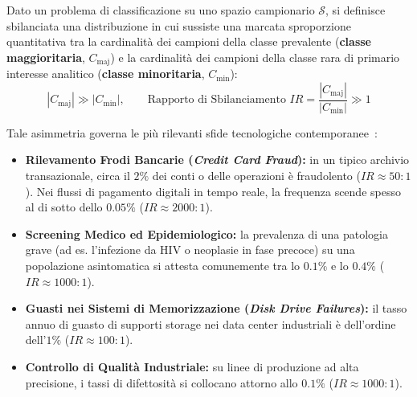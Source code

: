 \begin{definition}
Dato un problema di classificazione su uno spazio campionario $\mathcal{S}$, si definisce sbilanciata una distribuzione in cui sussiste una marcata sproporzione quantitativa tra la cardinalità dei campioni della classe prevalente (\textbf{classe maggioritaria}, $C_{\text{maj}}$) e la cardinalità dei campioni della classe rara di primario interesse analitico (\textbf{classe minoritaria}, $C_{\text{min}}$):
\begin{equation}
    |C_{\text{maj}}| \gg |C_{\text{min}}|, \qquad \text{Rapporto di Sbilanciamento } IR = \frac{|C_{\text{maj}}|}{|C_{\text{min}}|} \gg 1
\end{equation}
\end{definition}

Tale asimmetria governa le più rilevanti sfide tecnologiche contemporanee~\cite{mannocci2026imbalanced}:
\begin{itemize}
    \item \textbf{Rilevamento Frodi Bancarie (\textit{Credit Card Fraud}):} in un tipico archivio transazionale, circa il $2\%$ dei conti o delle operazioni è fraudolento ($IR \approx 50:1$). Nei flussi di pagamento digitali in tempo reale, la frequenza scende spesso al di sotto dello $0.05\%$ ($IR \approx 2000:1$).
    \item \textbf{Screening Medico ed Epidemiologico:} la prevalenza di una patologia grave (ad es. l'infezione da HIV o neoplasie in fase precoce) su una popolazione asintomatica si attesta comunemente tra lo $0.1\%$ e lo $0.4\%$ ($IR \approx 1000:1$).
    \item \textbf{Guasti nei Sistemi di Memorizzazione (\textit{Disk Drive Failures}):} il tasso annuo di guasto di supporti storage nei data center industriali è dell'ordine dell'$1\%$ ($IR \approx 100:1$).
    \item \textbf{Controllo di Qualità Industriale:} su linee di produzione ad alta precisione, i tassi di difettosità si collocano attorno allo $0.1\%$ ($IR \approx 1000:1$).
\end{itemize}

